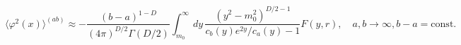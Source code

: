 \begin{equation}\label{phi2abtoinf2}
  \langle \varphi ^{2}(x)\rangle ^{(ab)}\approx -
  \frac{(b-a)^{1-D}}{(4\pi )^{D/2}\Gamma (D/2)}\int_{m_0}^{\infty }
  dy\,
  \frac{(y^2-m_0^2)^{D/2-1}}{c_b(y)e^{2y}/c_a(y)-1}
  F(y,r) ,\quad
  a,b\to \infty, b-a={\mathrm{const}}.
\end{equation}

